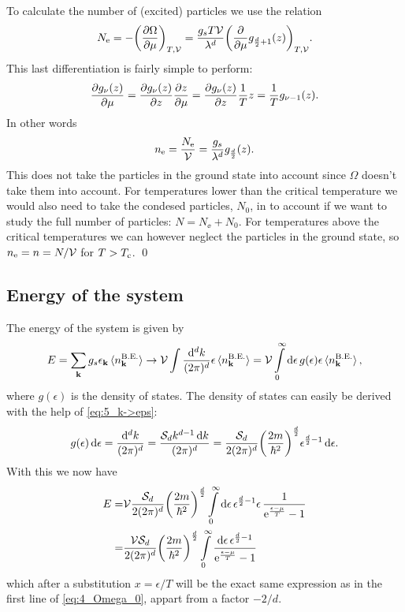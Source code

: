 \documentclass[11pt,letter, swedish, english
]{article}
\begin{document}
To calculate the number of (excited) particles we use the relation
\begin{equation}
N_{\mathrm{e}}=-\qty(\pdv{\Omega}{\mu})_{T,\mathcal{V}}
=\frac{g_sT\mathcal{V}}{\lambda^d}
\qty(\pdv{\mu}g_{\frac{d}{2}+1}(z))_{T,\mathcal{V}}.
\end{equation}
This last differentiation is fairly simple to perform:
\begin{equation}
\pdv{g_{\nu}(z)}{\mu}=
\pdv{g_{\nu}(z)}{z}\pdv{z}{\mu}=
\pdv{g_{\nu}(z)}{z}\frac{1}{T}z
=\frac{1}{T}g_{\nu-1}(z).
\end{equation}
In other words
\begin{equation}\label{eq:4_ne}
n_{\mathrm{e}}=\frac{N_{\mathrm{e}}}{\mathcal{V}}
=\frac{g_s}{\lambda^d}g_{\frac{d}{2}}(z).
\end{equation}
This does not take the particles in the ground state into account
since $\Omega$ doesn't take them into account. For temperatures lower
than the critical temperature we would also need to take the condesed
particles, $N_0$, in to account if we want to study the full number of
particles: $N=N_\ee+N_0$. For temperatures above the critical
temperatures we can however neglect the particles in the ground
state, so $n_{\mathrm{e}}=n=N/\mathcal{V}$ for $T>T_{\text{c}}$.
\qed

\subsection{Energy of the system}
The energy of the system is given by
\begin{equation}
E=\sum_{\vb{k}} g_s \epsilon_{\vb{k}}\ev*{n_{\vb{k}}^\text{B.E.}}
\to \V\int\frac{\rd^dk}{(2\pi)^d}
\epsilon\ev*{n_{\vb{k}}^\text{B.E.}}
=\V\int_0^\infty\rd\epsilon\, g(\epsilon)
\epsilon\ev*{n_{\vb{k}}^\text{B.E.}},
\end{equation}
where $g(\epsilon)$ is the density of states\footnotemark{}. The density
of states can easily be derived with the help of \eqref{eq:5_k->eps}:
\begin{equation}
g(\epsilon)\,\mathrm{d}\epsilon=\frac{\mathrm{d}^dk}{(2\pi)^d}
=\frac{\mathcal{S}_d k^{d-1}\,\mathrm{d}{k}}{(2\pi)^d}
=\frac{\mathcal{S}_d}{2(2\pi)^d}\qty(\frac{2m}{\hbar^2})^{\frac{d}{2}}
\epsilon^{\frac{d}{2}-1}\,\mathrm{d}\epsilon.
\end{equation}
With this we now have
\begin{equation}
\begin{aligned}
E=&\V\frac{\Sd}{2(2\pi)^d}\qty(\frac{2m}{\hbar^2})^{\D{2}}
\int_0^\infty\rd\epsilon\, \epsilon^{\D{2}-1}
\epsilon\,\frac{1}{\ee^{\frac{\epsilon-\mu}{T}}-1}\\
=&\frac{\V\Sd}{2(2\pi)^d}\qty(\frac{2m}{\hbar^2})^{\D{2}}
\int_0^\infty
\frac{\rd\epsilon\,\epsilon^{\D{2}-1}}{\ee^{\frac{\epsilon-\mu}{T}}-1}
\end{aligned}
\end{equation}
which after a substitution $x=\epsilon/T$ will be the exact same
expression as in the first line of \eqref{eq:4_Omega_0}, appart from a
factor $-2/d$. 
\end{document}
